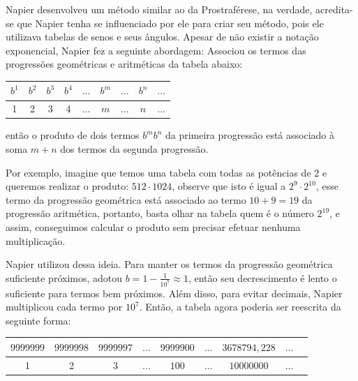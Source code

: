 

Napier desenvolveu um método similar ao da Prostraférese, na verdade, acredita-se que Napier tenha se influenciado por ele para criar seu método, pois ele utilizava tabelas de senos e seus ângulos. Apesar de não existir a notação exponencial, Napier fez a seguinte abordagem: Associou os termos das progressões geométricas e aritméticas da tabela abaixo:


\begin{table}[h]
\centering
\renewcommand{\arraystretch}{1.2} 
\begin{tabular}{|c|c|c|c|c|c|c|c|c|}
\hline
$b^1$ & $b^2$ & $b^3$ & $b^4$ & $\dots$ & $b^m$ & $\dots$ & $b^n$ & $\dots$ \\
\hline
1 & 2 & 3 & 4 & $\dots$ & $m$ & $\dots$ & $n$ & $\dots$ \\
\hline
\end{tabular}
\end{table}

\noindent 
então o produto de dois termos $b^m b^n$ da primeira progressão está associado à soma $m + n$ dos termos da segunda progressão.

Por exemplo, imagine que temos uma tabela com todas as potências de 2 e queremos realizar o produto: $512 \cdot 1024$, observe que isto é igual a $2^9 \cdot 2^{10}$, esse termo da progressão geométrica está associado ao termo $10 + 9 = 19$ da progressão aritmética, portanto, basta olhar na tabela quem é o número $2^{19}$, e assim, conseguimos calcular o produto sem precisar efetuar nenhuma multiplicação.

Napier utilizou dessa ideia. Para manter os termos da progressão geométrica suficiente próximos, adotou $b = 1 - \frac{1}{10^7} \approx 1$, então seu decrescimento é lento o suficiente para termos bem próximos. Além disso, para evitar decimais, Napier multiplicou cada termo por $10^7$. Então, a tabela agora poderia ser reescrita da seguinte forma:

\begin{table}[h]
\centering
\renewcommand{\arraystretch}{1.2} 
\begin{tabular}{|c|c|c|c|c|c|c|c|c|}
\hline
$9999999$ & $9999998$ & $9999997$ & $\dots$ & $9999900$ & $\dots$ & $3678794,228$ & $\dots$ \\
\hline
1 & 2 & 3 & $\dots$ & $100$ & $\dots$ & $10000000$ & $\dots$ \\
\hline
\end{tabular}
\end{table}


